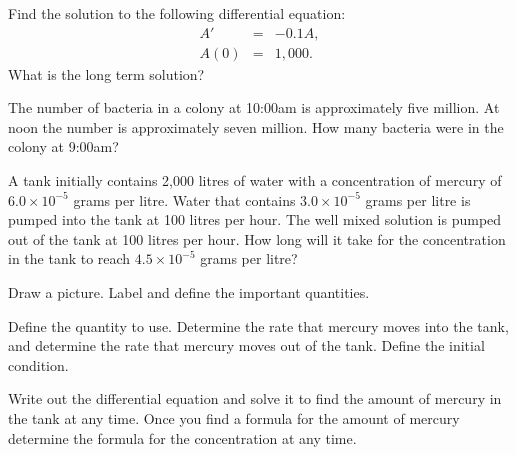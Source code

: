   \begin{problem}
  \item Find the solution to the following differential equation:
    \begin{eqnarray*}
      A' & = & -0.1 A, \\
      A(0) & = & 1,000.
    \end{eqnarray*}
    What is the long term solution?
    \vfill
    \clearpage
  \item The number of bacteria in a colony at 10:00am is approximately
    five million. At noon the number is approximately seven
    million. How many bacteria were in the colony at 9:00am?
    \vfill
  \end{problem}


  \begin{problem}

  \item A tank initially contains 2,000 litres of water with a
    concentration of mercury of $6.0\times 10^{-5}$ grams per
    litre. Water that contains $3.0\times 10^{-5}$ grams per litre is
    pumped into the tank at 100 litres per hour. The well mixed
    solution is pumped out of the tank at 100 litres per hour.  How
    long will it take for the concentration in the tank to reach
    $4.5\times 10^{-5}$ grams per litre?

    \begin{subproblem}
      \item Draw a picture. Label and define the important quantities.
        \vfill

      \item Define the quantity to use. Determine the rate that
        mercury moves into the tank, and determine the rate that
        mercury moves out of the tank. Define the initial condition.
        \vfill

        \clearpage

      \item Write out the differential equation and solve it to find
        the amount of mercury in the tank at any time. Once you find a
        formula for the amount of mercury determine the formula for
        the concentration at any time.

        \vfill
        

    \end{subproblem}



\end{problem}

